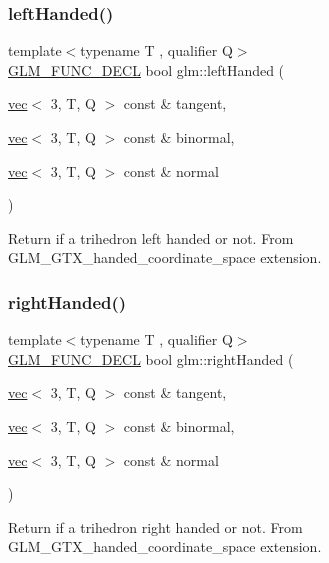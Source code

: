 \subsubsection{\texorpdfstring{left\+Handed()}{leftHanded()}}
{\footnotesize\ttfamily template$<$typename T , qualifier Q$>$ \\
\hyperlink{setup_8hpp_ab2d052de21a70539923e9bcbf6e83a51}{G\+L\+M\+\_\+\+F\+U\+N\+C\+\_\+\+D\+E\+CL} bool glm\+::left\+Handed (\begin{DoxyParamCaption}\item[{\hyperlink{structglm_1_1vec}{vec}$<$ 3, T, Q $>$ const \&}]{tangent,  }\item[{\hyperlink{structglm_1_1vec}{vec}$<$ 3, T, Q $>$ const \&}]{binormal,  }\item[{\hyperlink{structglm_1_1vec}{vec}$<$ 3, T, Q $>$ const \&}]{normal }\end{DoxyParamCaption})}

Return if a trihedron left handed or not. From G\+L\+M\+\_\+\+G\+T\+X\+\_\+handed\+\_\+coordinate\+\_\+space extension. \mbox{\label{group__gtx__handed__coordinate__space_ga99386a5ab5491871b947076e21699cc8}} 
\subsubsection{\texorpdfstring{right\+Handed()}{rightHanded()}}
{\footnotesize\ttfamily template$<$typename T , qualifier Q$>$ \\
\hyperlink{setup_8hpp_ab2d052de21a70539923e9bcbf6e83a51}{G\+L\+M\+\_\+\+F\+U\+N\+C\+\_\+\+D\+E\+CL} bool glm\+::right\+Handed (\begin{DoxyParamCaption}\item[{\hyperlink{structglm_1_1vec}{vec}$<$ 3, T, Q $>$ const \&}]{tangent,  }\item[{\hyperlink{structglm_1_1vec}{vec}$<$ 3, T, Q $>$ const \&}]{binormal,  }\item[{\hyperlink{structglm_1_1vec}{vec}$<$ 3, T, Q $>$ const \&}]{normal }\end{DoxyParamCaption})}

Return if a trihedron right handed or not. From G\+L\+M\+\_\+\+G\+T\+X\+\_\+handed\+\_\+coordinate\+\_\+space extension. 